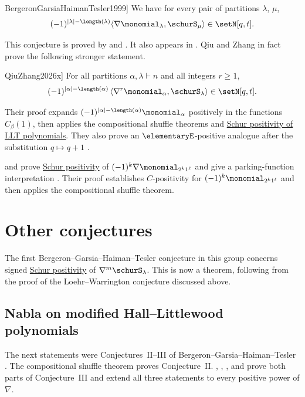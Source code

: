 \begin{conjecture}[Bergeron--Garsia--Haiman--Tesler (1999), \cite[Conj. IV]{BergeronGarsiaHaimanTesler1999}]
We have for every pair of partitions $\lambda$, $\mu$,
\[
(-1)^{|\lambda|-\length(\lambda)} \langle \nabla \monomial_\lambda, \schurS_\mu \rangle \in \setN[q,t].
\]
\end{conjecture}
This conjecture is proved by  and 
\cite[Thm.~1.2]{QiuZhang2026x}.  It also appears in
\cite[Conj.~11]{LoehrWarrington2007}.  Qiu and Zhang in fact prove the
following stronger statement.
\begin{theorem}[Qiu--Zhang \cite[Thm.~1.2]{QiuZhang2026x}]
For all partitions \(\alpha,\lambda\vdash n\) and all integers \(r\geq 1\),
\[
(-1)^{|\alpha|-\length(\alpha)}
\left\langle \nabla^r \monomial_\alpha,\schurS_\lambda \right\rangle
\in \setN[q,t].
\]
\end{theorem}
Their proof expands \((-1)^{|\alpha|-\length(\alpha)}\monomial_\alpha\)
positively in the functions \(C_\beta(1)\), then applies the compositional
shuffle theorems and \hyperref[lltSchurPositivity]{Schur positivity of LLT
polynomials}.  They also prove an
\(\elementaryE\)-positive analogue after the substitution \(q\mapsto q+1\)
\cite[Thm.~1.3]{QiuZhang2026x}.

 and  prove
\hyperref[schurPositiveDefinition]{Schur positivity} of
$(-1)^k\nabla \monomial_{2^k1^\ell}$ and give a parking-function
interpretation \cite{QuXin2025}.  Their proof establishes $C$-positivity for
$(-1)^k\monomial_{2^k1^\ell}$ and then applies the compositional shuffle
theorem.




\section[dhOther]{Other conjectures}


The first Bergeron--Garsia--Haiman--Tesler conjecture in this group concerns
signed \hyperref[schurPositiveDefinition]{Schur positivity} of
$\nabla^m\schurS_\lambda$.  This is now a theorem, following from the proof of
the Loehr--Warrington conjecture discussed above.

\subsection[nablaHallLittlewoodBGHT]{Nabla on modified Hall--Littlewood polynomials}

The next statements were Conjectures~II--III of
Bergeron--Garsia--Haiman--Tesler
\cite[Conjs.~II--III]{BergeronGarsiaHaimanTesler1999}.  The compositional
shuffle theorem proves Conjecture~II.  , ,
, and  prove both parts of Conjecture~III
and extend all three statements to every positive power of $\nabla$.

